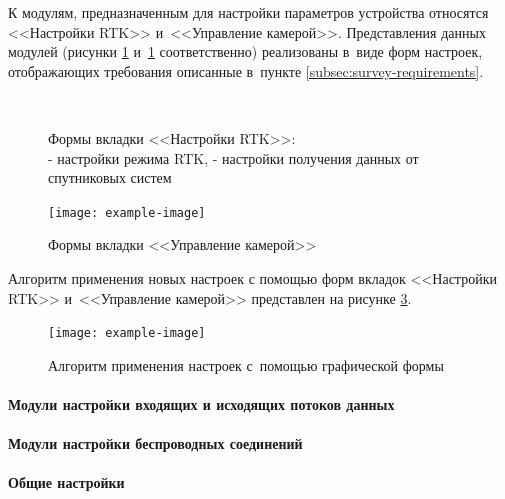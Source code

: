 К модулям, предназначенным для настройки параметров устройства относятся <<Настройки RTK>> и~<<Управление камерой>>. Представления данных модулей (рисунки \ref{fig:rtk-settings} и~\ref{fig:rtk-settings} соответственно) реализованы в~виде форм настроек, отображающих требования описанные в~пункте \ref{subsec:survey-requirements}.

\begin{figure}[h!]
  \centering
  \setlength{\fboxsep}{5pt}
  \\
  \vspace*{6pt}
  \caption{
    Формы вкладки <<Настройки RTK>>:\\
    \protect{} - настройки режима RTK,
    \protect{} - настройки получения данных от спутниковых систем
  }
  \label{fig:rtk-settings}
\end{figure}

\begin{figure}[h!]
  \centering
  \setlength{\fboxsep}{5pt}
  \texttt{[image: example-image]}
  \vspace*{6pt}
  \caption{Формы вкладки <<Управление камерой>>}
  \label{fig:camera-control}
\end{figure}

Алгоритм применения новых настроек с помощью форм вкладок <<Настройки RTK>> и~<<Управление камерой>> представлен на рисунке \ref{fig:basic-form-apply}.

\begin{figure}[h!]
  \centering
  \setlength{\fboxsep}{5pt}
  \texttt{[image: example-image]}
  \vspace*{6pt}
  \caption{Алгоритм применения настроек с~помощью графической формы}
  \label{fig:basic-form-apply}
\end{figure}

\paragraph{Модули настройки входящих и исходящих потоков данных}

\paragraph{Модули настройки беспроводных соединений}

\paragraph{Общие настройки}

\newpage
